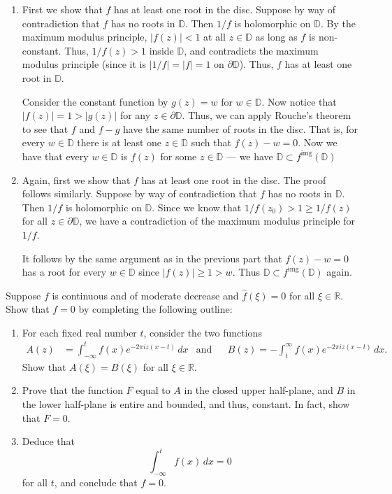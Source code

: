 \documentclass[12 pt, letterpaper]{hmcpset}
\begin{document}
\begin{solution}
	\begin{enumerate}
		\item First we show that $f$ has at least one root in the disc. Suppose by way of contradiction that $f$ has no roots in $\mathbb{D}$. Then $1/f$ is holomorphic on $\mathbb{D}$. By the maximum modulus principle, $\lvert f(z) \rvert < 1$ at all $z \in \mathbb{D}$ as long as $f$ is non-constant. Thus, $1/f(z) > 1$ inside $\mathbb{D}$, and contradicts the maximum modulus principle (since it is $\lvert 1/f \rvert = \lvert f \rvert = 1$ on $\partial \mathbb{D}$). Thus, $f$ has at least one root in $\mathbb{D}$.

			Consider the constant function by $g(z) = w$ for $w \in \mathbb{D}$. Now notice that $\lvert f(z) \rvert = 1 > \lvert g(z) \rvert$ for any $z \in \partial \mathbb{D}$. Thus, we can apply Rouche's theorem to see that $f$ and $f - g$ have the same number of roots in the disc. That is, for every $w \in \mathbb{D}$ there is at least one $z \in \mathbb{D}$ such that $f(z) - w = 0$. Now we have that every $w \in \mathbb{D}$ is $f(z)$ for some $z \in \mathbb{D}$ --- we have $\mathbb{D} \subset f^{\text{img}}(\mathbb{D})$
		\item Again, first we show that $f$ has at least one root in the disc. The proof follows similarly. Suppose by way of contradiction that $f$ has no roots in $\mathbb{D}$. Then $1/f$ is holomorphic on $\mathbb{D}$. Since we know that $1/f(z_{0}) > 1 \ge 1/f(z)$ for all $z \in \partial \mathbb{D}$, we have a contradiction of the maximum modulus principle for $1/f$.

			It follows by the same argument as in the previous part that $f(z) - w = 0$ has a root for every $w \in \mathbb{D}$ since $\lvert f(z) \rvert \ge 1 > w$. Thus $\mathbb{D} \subset f^{\text{img}}(\mathbb{D})$ again.
	\end{enumerate}
\end{solution}

\pagebreak

\begin{problem}[1.]
	Suppose $f$ is continuous and of moderate decrease and $\hat{f}(\xi) = 0$ for all $\xi \in \mathbb{R}$. Show that $f = 0$ by completing the following outline:
	\begin{enumerate}
		\item For each fixed real number $t$, consider the two functions
			\begin{align*}
				A(z) & = \int_{-\infty}^{t} f(x) e^{-2 \pi i z(x - t)} \, dx & \text{and} & & B(z) = - \int_{t}^{\infty} f(x) e^{- 2 \pi i z(x - t)} \, dx.
			\end{align*}
			Show that $A(\xi) = B(\xi)$ for all $\xi \in \mathbb{R}$.
		\item Prove that the function $F$ equal to $A$ in the closed upper half-plane, and $B$ in the lower half-plane is entire and bounded, and thus, constant. In fact, show that $F = 0$.
		\item Deduce that
			\[
				\int_{-\infty}^{t} f(x) \, dx = 0
			\]
			for all $t$, and conclude that $f = 0$.
	\end{enumerate}
\end{problem}
\end{document}
